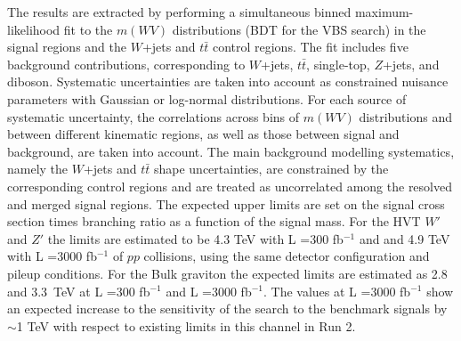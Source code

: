The results are extracted by performing a simultaneous binned maximum-likelihood fit to the $m(WV)$ distributions (BDT for the VBS search) 
in the signal regions and the $W$+jets and $t \bar{t}$ control regions. 
The fit includes five background contributions, corresponding to $W$+jets, $t \bar{t}$, single-top, $Z$+jets, and diboson. 
Systematic uncertainties are taken into account as constrained nuisance parameters with Gaussian or log-normal distributions. 
For each source of systematic uncertainty, the correlations across bins of $m(WV)$ distributions and between different kinematic regions, 
as well as those between signal and background, are taken into account. 
The main background modelling systematics, namely the $W$+jets and $t\bar{t}$ shape uncertainties, are constrained by the corresponding 
control regions and are treated as uncorrelated among the resolved and merged signal regions.            
The expected upper limits are set on the signal cross section times branching ratio as a function of the signal mass.  
For the HVT $W'$ and $Z'$ the limits are estimated to be 4.3 TeV with L =300 fb$^{-1}$ and and 4.9 TeV with L =3000 fb$^{-1}$ of $pp$ collisions, 
using the same detector configuration and pileup conditions. For the Bulk graviton the expected limits are estimated as 2.8 and 3.3~TeV 
at L =300 fb$^{-1}$ and L =3000 fb$^{-1}$.
The values at L =3000 fb$^{-1}$ show an expected increase to the sensitivity of the search to the benchmark signals by $\sim$1 TeV with 
respect to existing limits in this channel in Run 2. 

